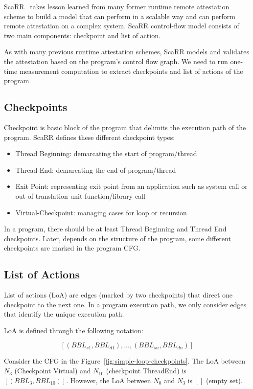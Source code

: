 ScaRR~\cite{toffaliniScaRRScalableRuntime2019} takes lesson learned from many
former runtime remote attestation scheme to build a model that can perform in a
scalable way and can perform remote attestation on a complex system. ScaRR
control-flow model consists of two main components: checkpoint and list of
action. 

As with many previous runtime attestation schemes, ScaRR models and validates
the attestation based on the program's control flow graph. We need to run
one-time measurement computation to extract checkpoints and list of actions of
the program.

\subsection{Checkpoints} \label{sec:scarr-checkpoints} Checkpoint is basic block
of the program that delimits the execution path of the program. ScaRR defines
these different checkpoint types:
\begin{itemize}
    \item Thread Beginning: demarcating the start of program/thread
    \item Thread End: demarcating the end of program/thread
    \item Exit Point: representing exit point from an application such as system
    call or out of translation unit function/library call
    \item Virtual-Checkpoint: managing cases for loop or recursion
\end{itemize}

In a program, there should be at least Thread Beginning and Thread End
checkpoints. Later, depends on the structure of the program, some different
checkpoints are marked in the program CFG.

\subsection{List of Actions}

List of actions (LoA) are edges (marked by two checkpoints) that direct one
checkpoint to the next one. In a program execution path, we only consider edges
that identify the unique execution path.

LoA is defined through the following notation:


$$[(BBL_{s1},BBL_{d1}),...,(BBL_{sn},BBL_{dn})]$$

Consider the CFG in the Figure~\ref{fig:simple-loop-checkpoints}. The LoA
between $N_3$ (Checkpoint Virtual) and $N_{10}$ (checkpoint ThreadEnd) is
$[(BBL_3, BBL_{10})]$. However, the LoA between $N_0$ and $N_3$ is $[]$ (empty
set).

